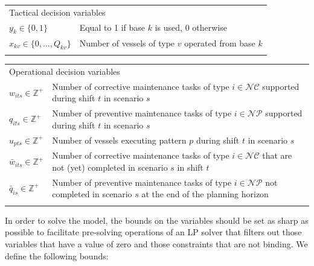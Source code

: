 \begin{tabular}{ll}
	\\
	\multicolumn{2}{l}{Tactical decision variables}\\
	$y_{k} \in \{0,1\}$ 	& Equal to 1 if base $k$ is used, 0 otherwise\\
	$x_{kv} \in\{0,\ldots,Q_{kv}\}$ &	Number of vessels of type $v$ operated from base $k$\\
	\\
\end{tabular}	

\begin{tabular}{ll}	
	\multicolumn{2}{l}{Operational decision variables}\\
	$w_{its}\in\mathbb{Z}^+$	&	\parbox[t]{9.5cm}{Number of corrective maintenance tasks of type  $i \in\mathcal{NC}$ supported during shift $t$ in scenario $s$}\\
	$q_{its} \in\mathbb{Z}^+$	&	\parbox[t]{9.5cm}{Number of preventive maintenance tasks of type $i \in \mathcal{NP}$ supported during shift $t$ in scenario $s$}\\
	$u_{pts}\in\mathbb{Z}^+$ &	\parbox[t]{9.5cm}{Number of vessels executing pattern $p$ during shift $t$ in scenario $s$}\\
	$\bar{w}_{its}\in\mathbb{Z}^+$	&	\parbox[t]{9.5cm}{Number of corrective maintenance tasks of type  $i \in\mathcal{NC}$ that are not (yet) completed in scenario $s$ in shift $t$}\\
	$\bar{q}_{i s}\in\mathbb{Z}^+$	&	\parbox[t]{9.5cm}{Number of preventive maintenance tasks of type $i \in \mathcal{NP}$ not completed in scenario $s$ at the end of the planning horizon}  \\
								\\	
\end{tabular}

In order to solve the model, the bounds on the variables should be set as sharp as possible to facilitate pre-solving operations of an LP solver that filters out those variables that have a value of zero and those constraints that are not binding. We define the following bounds:


